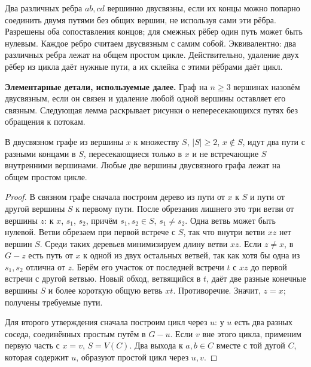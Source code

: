 \begin{definition}
Два различных ребра \(ab,cd\) вершинно двусвязны, если их концы можно
попарно соединить двумя путями без общих вершин, не используя сами
эти рёбра. Разрешены оба сопоставления концов; для смежных рёбер один
путь может быть нулевым. Каждое ребро считаем двусвязным с самим собой.
Эквивалентно: два различных ребра лежат на общем простом цикле.
Действительно, удаление двух рёбер из цикла даёт нужные пути, а их
склейка с этими рёбрами даёт цикл.
\end{definition}


\textbf{Элементарные детали, используемые далее.}
Граф на \(n\ge3\) вершинах назовём двусвязным, если он связен
и удаление любой одной вершины оставляет его связным.
Следующая лемма раскрывает рисунки о непересекающихся путях без обращения к потокам.
\begin{lemma}\label{lem:vertex-paths}
В двусвязном графе из вершины \(x\) к множеству \(S\), \(|S|\ge2\),
\(x\notin S\), идут два пути с разными концами в \(S\), пересекающиеся
только в \(x\) и не встречающие \(S\) внутренними вершинами.
Любые две вершины двусвязного графа лежат на общем простом цикле.
\end{lemma}
\begin{proof}
В связном графе сначала построим дерево из пути от \(x\) к \(S\)
и пути от другой вершины \(S\) к первому пути. После обрезания лишнего
это три ветви от вершины \(z\): к \(x\), \(s_1\), \(s_2\), причём
\(s_1,s_2\in S\), \(s_1\ne s_2\). Одна ветвь может быть нулевой.
Ветви обрезаем при первой встрече с \(S\), так что внутри ветви \(xz\)
нет вершин \(S\). Среди таких деревьев минимизируем длину ветви \(xz\).
Если \(z\ne x\), в \(G-z\) есть путь от \(x\) к одной из двух остальных
ветвей, так как хотя бы одна из \(s_1,s_2\) отлична от \(z\).
Берём его участок от последней встречи \(t\) с \(xz\) до первой
встречи с другой ветвью. Новый обход, ветвящийся в \(t\), даёт две
разные конечные вершины \(S\) и более короткую общую ветвь \(xt\).
Противоречие. Значит, \(z=x\); получены требуемые пути.

Для второго утверждения сначала построим цикл через \(u\): у \(u\)
есть два разных соседа, соединённых простым путём в \(G-u\).
Если \(v\) вне этого цикла, применим первую часть с \(x=v\), \(S=V(C)\).
Два выхода к \(a,b\in C\) вместе с той дугой \(C\), которая содержит
\(u\), образуют простой цикл через \(u,v\).
\end{proof}



